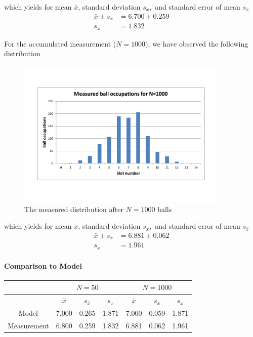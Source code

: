 \documentclass{scrreprt}
\begin{document}
which yields for mean $\bar{x}$, standard deviation $s_x,$ and standard error of mean $s_{\bar{x}}$
\begin{align*}
\bar{x} \pm s_{\bar{x}} &= 6.700 \pm 0.259\\
s_x &= 1.832
\end{align*}

For the accumulated measurement ($N=1000)$, we have observed the following distribution

\begin{figure}[H]
    \center   
        \includegraphics[width=0.9\textwidth]{img/ball_occup_n_1000}
        \caption{The measured distribution after $N=1000$ balls}
\end{figure}

which yields for mean $\bar{x}$, standard deviation $s_x,$ and standard error of mean $s_{\bar{x}}$
\begin{align*}
\bar{x} \pm s_{\bar{x}} &= 6.881 \pm 0.062\\
s_x &= 1.961
\end{align*}

\paragraph*{Comparison to Model}

\begin{center}
    \begin{tabular}{|c|ccc|ccc|}
    \hline
    & \multicolumn{3}{c|}{$N=50$} & \multicolumn{3}{|c|}{$N=1000$}\\
    \hline \hline
    & $\bar{x}$ & $s_{\bar{x}}$ & $s_x$ & $\bar{x}$ & $s_{\bar{x}}$ & $s_x$ \\
    \hline \hline
    Model & 7.000 & 0.265 & 1.871 & 7.000 & 0.059 & 1.871\\
    \hline
    Measurement & 6.800 & 0.259 & 1.832 & 6.881 & 0.062 & 1.961\\
    \hline
    \end{tabular}
\end{center}
\end{document}
